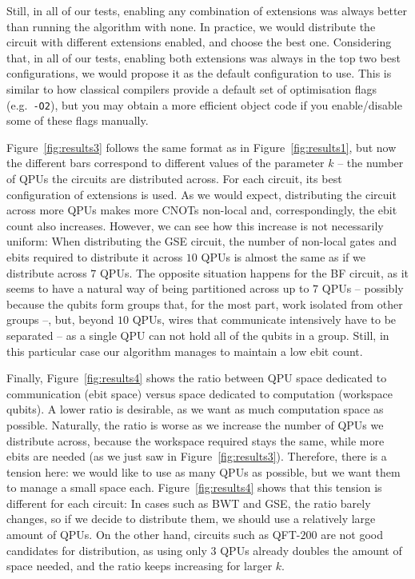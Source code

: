 

Still, in all of our tests, enabling any combination of extensions was always better than running the algorithm with none. In practice, we would distribute the circuit with different extensions enabled, and choose the best one. Considering that, in all of our tests, enabling both extensions was always in the top two best configurations, we would propose it as the default configuration to use. This is similar to how classical compilers provide a default set of optimisation flags (e.g.\ \texttt{-O2}), but you may obtain a more efficient object code if you enable/disable some of these flags manually.



Figure~\ref{fig:results3} follows the same format as in Figure~\ref{fig:results1}, but now the different bars correspond to different values of the parameter \(k\) -- the number of QPUs the circuits are distributed across. For each circuit, its best configuration of extensions is used. As we would expect, distributing the circuit across more QPUs makes more CNOTs non-local and, correspondingly, the ebit count also increases. However, we can see how this increase is not necessarily uniform: When distributing the GSE circuit, the number of non-local gates and ebits required to distribute it across \(10\) QPUs is almost the same as if we distribute across \(7\) QPUs. The opposite situation happens for the BF circuit, as it seems to have a natural way of being partitioned across up to \(7\) QPUs -- possibly because the qubits form groups that, for the most part, work isolated from other groups --, but, beyond \(10\) QPUs, wires that communicate intensively have to be separated -- as a single QPU can not hold all of the qubits in a group. Still, in this particular case our algorithm manages to maintain a low ebit count. 



Finally, Figure~\ref{fig:results4} shows the ratio between QPU space dedicated to communication (ebit space) versus space dedicated to computation (workspace qubits). A lower ratio is desirable, as we want as much computation space as possible. Naturally, the ratio is worse as we increase the number of QPUs we distribute across, because the workspace required stays the same, while more ebits are needed (as we just saw in Figure~\ref{fig:results3}). Therefore, there is a tension here: we would like to use as many QPUs as possible, but we want them to manage a small space each. Figure~\ref{fig:results4} shows that this tension is different for each circuit: In cases such as BWT and GSE, the ratio barely changes, so if we decide to distribute them, we should use a relatively large amount of QPUs. On the other hand, circuits such as QFT-\(200\) are not good candidates for distribution, as using only \(3\) QPUs already doubles the amount of space needed, and the ratio keeps increasing for larger \(k\).


